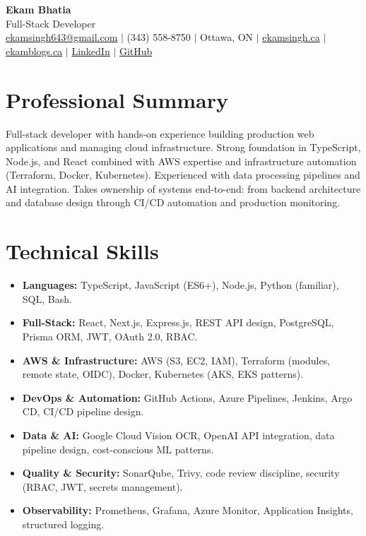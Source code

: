 \documentclass[11pt,a4paper]{article}
\begin{document}
\begin{center}
    {\LARGE \textbf{Ekam Bhatia}} \\
    \vspace{2pt}
    {\normalsize Full-Stack Developer} \\
    \vspace{4pt}
    \small
    \href{mailto:ekamsingh643@gmail.com}{ekamsingh643@gmail.com} $|$
    (343) 558-8750 $|$ Ottawa, ON $|$
    \href{https://www.ekamsingh.ca}{ekamsingh.ca} $|$
    \href{https://www.ekamblogs.ca}{ekamblogs.ca} $|$
    \href{https://www.linkedin.com/in/ekam-bhatia-335840168}{LinkedIn} $|$
    \href{https://github.com/bhat0155}{GitHub}
\end{center}

\section{Professional Summary}
Full-stack developer with hands-on experience building production web applications and managing cloud infrastructure. Strong foundation in TypeScript, Node.js, and React combined with AWS expertise and infrastructure automation (Terraform, Docker, Kubernetes). Experienced with data processing pipelines and AI integration. Takes ownership of systems end-to-end: from backend architecture and database design through CI/CD automation and production monitoring.

\section{Technical Skills}
\begin{itemize}
    \item \textbf{Languages:} TypeScript, JavaScript (ES6+), Node.js, Python (familiar), SQL, Bash.
    \item \textbf{Full-Stack:} React, Next.js, Express.js, REST API design, PostgreSQL, Prisma ORM, JWT, OAuth 2.0, RBAC.
    \item \textbf{AWS \& Infrastructure:} AWS (S3, EC2, IAM), Terraform (modules, remote state, OIDC), Docker, Kubernetes (AKS, EKS patterns).
    \item \textbf{DevOps \& Automation:} GitHub Actions, Azure Pipelines, Jenkins, Argo CD, CI/CD pipeline design.
    \item \textbf{Data \& AI:} Google Cloud Vision OCR, OpenAI API integration, data pipeline design, cost-conscious ML patterns.
    \item \textbf{Quality \& Security:} SonarQube, Trivy, code review discipline, security (RBAC, JWT, secrets management).
    \item \textbf{Observability:} Prometheus, Grafana, Azure Monitor, Application Insights, structured logging.
\end{itemize}
\end{document}
